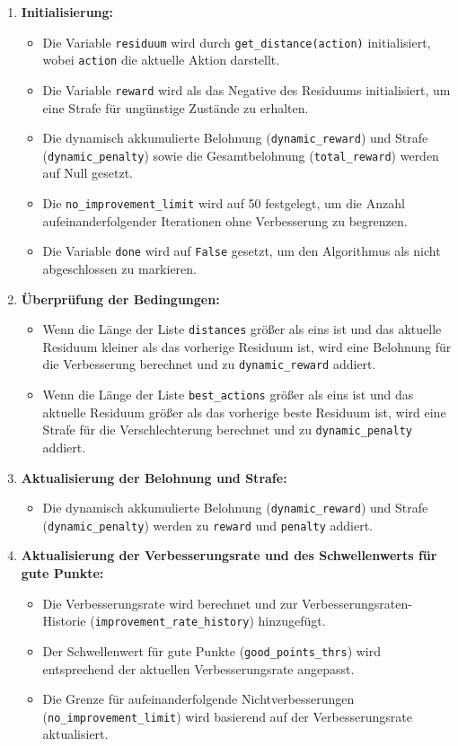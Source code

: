 \documentclass{article}
\theoremstyle{newline}
\begin{document}
\begin{onehalfspace}
\begin{enumerate}
	\item \textbf{Initialisierung:}
	\begin{itemize}
		\item Die Variable \texttt{residuum} wird durch \texttt{get\_distance(action)} initialisiert, wobei \texttt{action} die aktuelle Aktion darstellt.
		\item Die Variable \texttt{reward} wird als das Negative des Residuums initialisiert, um eine Strafe für ungünstige Zustände zu erhalten.
		\item Die dynamisch akkumulierte Belohnung (\texttt{dynamic\_reward}) und Strafe (\texttt{dynamic\_penalty}) sowie die Gesamtbelohnung (\texttt{total\_reward}) werden auf Null gesetzt.
		\item Die \texttt{no\_improvement\_limit} wird auf 50 festgelegt, um die Anzahl aufeinanderfolgender Iterationen ohne Verbesserung zu begrenzen.
		\item Die Variable \texttt{done} wird auf \texttt{False} gesetzt, um den Algorithmus als nicht abgeschlossen zu markieren.
	\end{itemize}
	
	\item \textbf{Überprüfung der Bedingungen:}
	\begin{itemize}
		\item Wenn die Länge der Liste \texttt{distances} größer als eins ist und das aktuelle Residuum kleiner als das vorherige Residuum ist, wird eine Belohnung für die Verbesserung berechnet und zu \texttt{dynamic\_reward} addiert.
		\item Wenn die Länge der Liste \texttt{best\_actions} größer als eins ist und das aktuelle Residuum größer als das vorherige beste Residuum ist, wird eine Strafe für die Verschlechterung berechnet und zu \texttt{dynamic\_penalty} addiert.
	\end{itemize}
	
	\item \textbf{Aktualisierung der Belohnung und Strafe:}
	\begin{itemize}
		\item Die dynamisch akkumulierte Belohnung (\texttt{dynamic\_reward}) und Strafe (\texttt{dynamic\_penalty}) werden zu \texttt{reward} und \texttt{penalty} addiert.
	\end{itemize}
	
	\item \textbf{Aktualisierung der Verbesserungsrate und des Schwellenwerts für gute Punkte:}
	\begin{itemize}
		\item Die Verbesserungsrate wird berechnet und zur Verbesserungsraten-Historie (\texttt{improvement\_rate\_history}) hinzugefügt.
		\item Der Schwellenwert für gute Punkte (\texttt{good\_points\_thrs}) wird entsprechend der aktuellen Verbesserungsrate angepasst.
		\item Die Grenze für aufeinanderfolgende Nichtverbesserungen (\texttt{no\_improvement\_limit}) wird basierend auf der Verbesserungsrate aktualisiert.
	\end{itemize}
	

\end{enumerate}
\end{onehalfspace}
\end{document}
